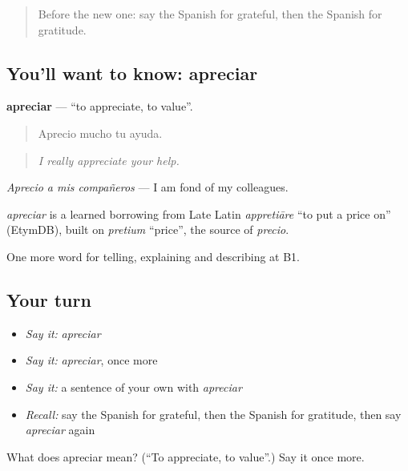 \label{lesson:ES-C720-apreciar}



\begin{quote}
Before the new one: say the Spanish for grateful, then the Spanish for gratitude.
\end{quote}

\subsection*{You'll want to know: apreciar}
\textbf{apreciar} — \textquotedblleft{}to appreciate, to value\textquotedblright{}.

\begin{quote}
Aprecio mucho tu ayuda.
\end{quote}

\begin{quote}
\emph{I really appreciate your help.}
\end{quote}

\emph{Aprecio a mis compañeros} — I am fond of my colleagues.

\begin{cousinweb}
\emph{apreciar} is a learned borrowing from Late Latin \emph{appretiāre} \textquotedblleft{}to put a price on\textquotedblright{} (EtymDB), built on \emph{pretium} \textquotedblleft{}price\textquotedblright{}, the source of \emph{precio}.
\end{cousinweb}

\begin{grammarlens}[title={What you've built}]
One more word for telling, explaining and describing at B1.
\end{grammarlens}

\subsection*{Your turn}
\begin{itemize}
\raggedright
  \item \emph{Say it:} \emph{apreciar}
  \item \emph{Say it:} \emph{apreciar}, once more
  \item \emph{Say it:} a sentence of your own with \emph{apreciar}
  \item \emph{Recall:} say the Spanish for grateful, then the Spanish for gratitude, then say \emph{apreciar} again
\end{itemize}

\begin{tcolorbox}[breakable,colback=teal!4,colframe=teal!35!black,title={Before you move on}]
What does apreciar mean? (\textquotedblleft{}To appreciate, to value\textquotedblright{}.) Say it once more.
\end{tcolorbox}
